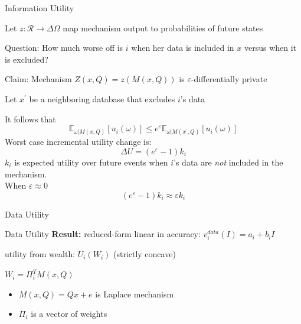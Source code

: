 \begin{frame}{Information Utility}
  \begin{wideitemize}
    \item Let $z:\mathcal{R}\rightarrow\Delta\Omega$ map mechanism output to probabilities of future states
    \item Question: How much worse off is $i$ when her data is included in $x$ versus when it is excluded?
    \item Claim: Mechanism $Z(x,Q) = z(M(x,Q))$ is $\varepsilon$-differentially private 
    \item Let $x^\prime$ be a neighboring database that excludes $i$'s data   
  \end{wideitemize}
  It follows that
$$\mathbb{E}_{\omega|M(x,Q)}\left[u_{i}(\omega)\right] \le e^{\varepsilon}\mathbb{E}_{\omega|M(x^\prime,Q)}\left[u_{i}(\omega)\right]$$
  Worst case incremental utility change is:
  $$\Delta U = \left(e^{\varepsilon}-1\right)k_{i}$$ 
  $k_{i}$ is expected utility over future events when $i$'s data are \emph{not} included in the mechanism.\ \\
  When $\varepsilon \approx 0$
  $$\left(e^{\varepsilon}-1\right)k_{i}\approx\varepsilon k_{i}$$
\end{frame}

\begin{transitionframe}
  \begin{center}
    \Huge Data Utility
  \end{center}
\end{transitionframe}

\begin{frame}{Data Utility}
  \textbf{Result:} reduced-form linear in accuracy: $v^{data}_{i}(I) =  a_{i} + b_{i}I$
  \begin{wideitemize}
    \item utility from wealth: $U_{i}(W_{i})$ (strictly concave)
    \item $W_{i} = \Pi_{i}^{T} M(x,Q)$ 
    \begin{itemize}
      \item $M(x,Q) = Qx + e$ is Laplace mechanism
      \item $\Pi_{i}$ is a vector of weights
    \end{itemize} 
  \end{wideitemize}

  
\end{frame}

